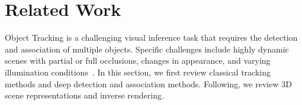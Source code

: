\section{Related Work}\label{sec:related}
\vspace{0.5\baselineskip}
\noindent
\noindent Object Tracking is a challenging visual inference task that requires the detection and association of multiple objects. Specific challenges include highly dynamic scenes with partial or full occlusions, changes in appearance, and varying illumination conditions~\cite{yilmaz2006object, wu2013online, smeulders2013visual}. In this section, we first review classical tracking methods and deep detection and association methods. Following, we review 3D scene representations and inverse rendering. %



